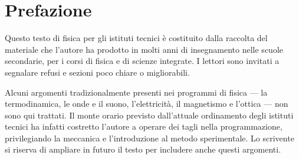 \chapter*{Prefazione}
Questo testo di fisica per gli istituti tecnici è costituito dalla raccolta del materiale che l'autore ha prodotto in molti anni di insegnamento nelle scuole secondarie, per i corsi di fisica e di scienze integrate. I lettori sono invitati a segnalare refusi e sezioni poco chiare o migliorabili.

Alcuni argomenti tradizionalmente presenti nei programmi di fisica --- la termodinamica, le onde e il suono, l'elettricità, il magnetismo e l'ottica --- non sono qui trattati. Il monte orario previsto dall'attuale ordinamento degli istituti tecnici ha infatti costretto l'autore a operare dei tagli nella programmazione, privilegiando la meccanica e l'introduzione al metodo sperimentale. Lo scrivente si riserva di ampliare in futuro il testo per includere anche questi argomenti.

